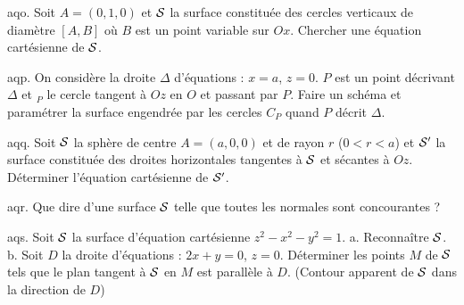 \exo [Level=2,Fight=2,Learn=2,Type=\TravauxDirigés,Field=\Surfaces,Origin=Quercia,Solution={$y(x^2+(y-1)^2 + z^2) = z^2$.}] aqo.
Soit $A=(0,1,0)$ et ${\cal S}$ la surface constituée des cercles verticaux de
diamètre $[A,B]$ où $B$ est un point variable sur $Ox$. Chercher une
équation cartésienne de ${\cal S}$.

\exo [Level=2,Fight=2,Learn=2,Type=\TravauxDirigés,Field=\Surfaces,Origin={Chimie P' 91},Solution={$x={a\over 2}(1+\cos u)$,
    $y={v \over 2}(1+\cos u)$,
$z={\sqrt{a^2+v^2}\over 2}\sin u$.}] aqp. 
On considère la droite $\Delta$ d'équations : $x=a$, $z=0$.
$P$ est un point décrivant $\Delta$ et $_P$ le cercle tangent à $Oz$ en
$O$ et passant par $P$. Faire un schéma et paramétrer la surface engendrée par les cercles $C_P$ quand $P$ décrit $\Delta$.

\exo [Level=2,Fight=2,Learn=2,Type=\TravauxDirigés,Field=\Surfaces,Origin=Quercia,Solution={$a^2y^2 = (x^2+y^2)(r^2-z^2)$.}] aqq.
Soit ${\cal S}$ la sphère de centre $A=(a,0,0)$ et de rayon $r$ ($0 < r < a$) et
${\cal S}'$ la surface constituée des droites horizontales tangentes à ${\cal S}$
et sécantes à $Oz$. Déterminer l'équation cartésienne de ${\cal S}'$.

\exo [Level=2,Fight=3,Learn=3,Type=\TravauxDirigés,Field=\Surfaces,Origin=Quercia,Solution=] aqr.
Que dire d'une surface ${\cal S}$ telle que toutes les normales sont
concourantes ?

\exo [Level=2,Fight=2,Learn=2,Type=\TravauxDirigés,Field=\Surfaces,Origin=Quercia,Solution={a. Hyperboloïde de révolution à deux nappes.\PAR\noindent
b. $x = 2y$, $z^2 = 1 + 5y^2$.
}] aqs.
Soit ${\cal S}$ la surface d'équation cartésienne $z^2-x^2-y^2 = 1$. \PAR\noindent
a. Reconnaître ${\cal S}$. \PAR\noindent
b. Soit $D$ la droite d'équations : $2x+y = 0$, $z=0$. Déterminer les points $M$ de ${\cal S}$ tels que le plan tangent à ${\cal S}$ en $M$ est parallèle à $D$. (Contour apparent de ${\cal S}$ dans la direction de $D$)

\endinput
